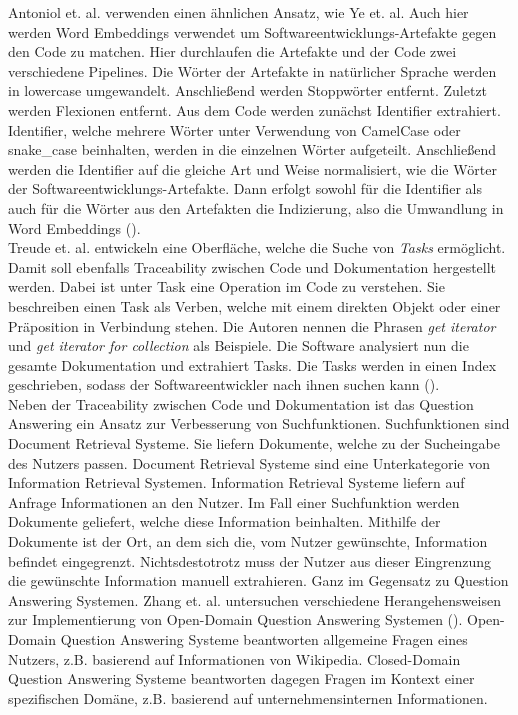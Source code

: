 Antoniol et. al. verwenden einen ähnlichen Ansatz, wie Ye et. al.
Auch hier werden Word Embeddings verwendet um Softwareentwicklungs-Artefakte gegen den Code zu matchen.
Hier durchlaufen die Artefakte und der Code zwei verschiedene Pipelines.
Die Wörter der Artefakte in natürlicher Sprache werden in lowercase umgewandelt.
Anschließend werden Stoppwörter entfernt.
Zuletzt werden Flexionen entfernt.
Aus dem Code werden zunächst Identifier extrahiert.
Identifier, welche mehrere Wörter unter Verwendung von CamelCase oder snake\_case beinhalten, werden in die einzelnen Wörter aufgeteilt.
Anschließend werden die Identifier auf die gleiche Art und Weise normalisiert, wie die Wörter der Softwareentwicklungs-Artefakte.
Dann erfolgt sowohl für die Identifier als auch für die Wörter aus den Artefakten die Indizierung, also die Umwandlung in Word Embeddings (\cite{Antoniol_Canfora_Casazza_DeLucia_2000}).\\

Treude et. al. entwickeln eine Oberfläche, welche die Suche von \textit{Tasks} ermöglicht.
Damit soll ebenfalls Traceability zwischen Code und Dokumentation hergestellt werden.
Dabei ist unter Task eine Operation im Code zu verstehen.
Sie beschreiben einen Task als Verben, welche mit einem direkten Objekt oder einer Präposition in Verbindung stehen.
Die Autoren nennen die Phrasen \textit{get iterator} und \textit{get iterator for collection} als Beispiele.
Die Software analysiert nun die gesamte Dokumentation und extrahiert Tasks.
Die Tasks werden in einen Index geschrieben, sodass der Softwareentwickler nach ihnen suchen kann (\cite{Treude_Sicard_Klocke_Robillard_2015}).\\

Neben der Traceability zwischen Code und Dokumentation ist das Question Answering ein Ansatz zur Verbesserung von Suchfunktionen.
Suchfunktionen sind Document Retrieval Systeme.
Sie liefern Dokumente, welche zu der Sucheingabe des Nutzers passen.
Document Retrieval Systeme sind eine Unterkategorie von Information Retrieval Systemen.
Information Retrieval Systeme liefern auf Anfrage Informationen an den Nutzer.
Im Fall einer Suchfunktion werden Dokumente geliefert, welche diese Information beinhalten.
Mithilfe der Dokumente ist der Ort, an dem sich die, vom Nutzer gewünschte, Information befindet eingegrenzt.
Nichtsdestotrotz muss der Nutzer aus dieser Eingrenzung die gewünschte Information manuell extrahieren.
Ganz im Gegensatz zu Question Answering Systemen.
Zhang et. al. untersuchen verschiedene Herangehensweisen zur Implementierung von Open-Domain Question Answering Systemen (\cite{Zhang_Chen_Xu_Cao_Chen_Cohn_Fang_2023}).
Open-Domain Question Answering Systeme beantworten allgemeine Fragen eines Nutzers, z.B. basierend auf Informationen von Wikipedia.
Closed-Domain Question Answering Systeme beantworten dagegen Fragen im Kontext einer spezifischen Domäne, z.B. basierend auf unternehmensinternen Informationen.\\

